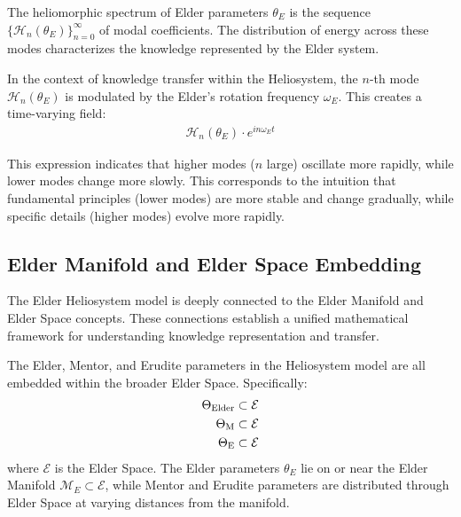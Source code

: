 \begin{definition}
The heliomorphic spectrum of Elder parameters $\theta_E$ is the sequence $\{\mathcal{H}_n(\theta_E)\}_{n=0}^{\infty}$ of modal coefficients. The distribution of energy across these modes characterizes the knowledge represented by the Elder system.
\end{definition}

In the context of knowledge transfer within the Heliosystem, the $n$-th mode $\mathcal{H}_n(\theta_E)$ is modulated by the Elder's rotation frequency $\omega_E$. This creates a time-varying field:
\begin{align}
\mathcal{H}_n(\theta_E) \cdot e^{in\omega_E t}
\end{align}

This expression indicates that higher modes ($n$ large) oscillate more rapidly, while lower modes change more slowly. This corresponds to the intuition that fundamental principles (lower modes) are more stable and change gradually, while specific details (higher modes) evolve more rapidly.

\subsection{Elder Manifold and Elder Space Embedding}

The Elder Heliosystem model is deeply connected to the Elder Manifold and Elder Space concepts. These connections establish a unified mathematical framework for understanding knowledge representation and transfer.

\begin{theorem}
The Elder, Mentor, and Erudite parameters in the Heliosystem model are all embedded within the broader Elder Space. Specifically:
\begin{align}
\Theta_{\text{Elder}} &\subset \mathcal{E}\\
\Theta_{\text{M}} &\subset \mathcal{E}\\
\Theta_{\text{E}} &\subset \mathcal{E}
\end{align}
where $\mathcal{E}$ is the Elder Space. The Elder parameters $\theta_E$ lie on or near the Elder Manifold $\mathcal{M}_E \subset \mathcal{E}$, while Mentor and Erudite parameters are distributed through Elder Space at varying distances from the manifold.
\end{theorem}

